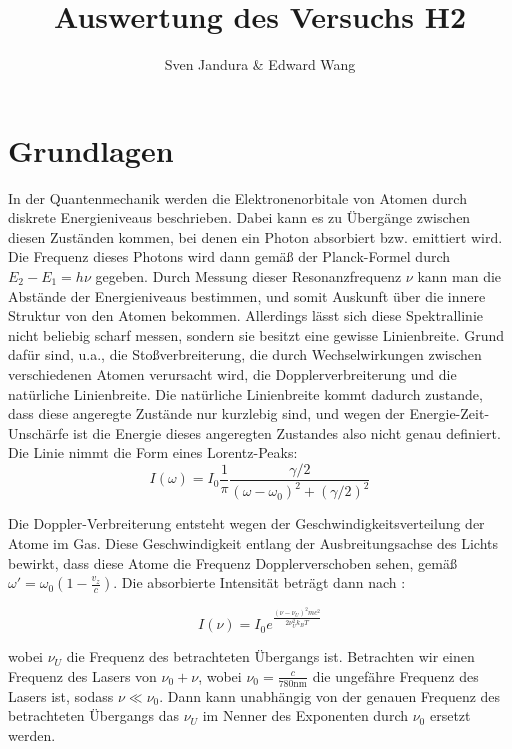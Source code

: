 \documentclass[a4paper,parskip]{scrartcl}
\author{Sven Jandura \& Edward Wang}
\title{Auswertung des Versuchs H2}
\begin{document}
\maketitle

\tableofcontents

\section{Grundlagen}

In der Quantenmechanik werden die Elektronenorbitale von Atomen durch diskrete Energieniveaus beschrieben. Dabei kann es zu Übergänge zwischen diesen Zuständen kommen, bei denen ein Photon absorbiert bzw. emittiert wird. Die Frequenz dieses Photons wird dann gemäß der Planck-Formel durch $E_2 - E_1 = h \nu$ gegeben. Durch Messung dieser Resonanzfrequenz $\nu$ kann man die Abstände der Energieniveaus bestimmen, und somit Auskunft über die innere Struktur von den Atomen bekommen. Allerdings lässt sich diese Spektrallinie nicht beliebig scharf messen, sondern sie besitzt eine gewisse Linienbreite. Grund dafür sind, u.a., die Stoßverbreiterung, die durch Wechselwirkungen zwischen verschiedenen Atomen verursacht wird, die Dopplerverbreiterung und die natürliche Linienbreite. Die natürliche Linienbreite kommt dadurch zustande, dass diese angeregte Zustände nur kurzlebig sind, und wegen der Energie-Zeit-Unschärfe ist die Energie dieses angeregten Zustandes also nicht genau definiert. Die Linie nimmt die Form eines Lorentz-Peaks:
\begin{equation*}
    I(\omega) = I_0 \frac{1}{\pi} \frac{\gamma/2}{(\omega - \omega_0)^2 + (\gamma / 2)^2}
\end{equation*}

Die Doppler-Verbreiterung entsteht wegen der Geschwindigkeitsverteilung der Atome im Gas. Diese Geschwindigkeit entlang der Ausbreitungsachse des Lichts bewirkt, dass diese Atome die Frequenz Dopplerverschoben sehen, gemäß $\omega' = \omega_0 \left( 1 - \frac{v_z}{c} \right) $.
Die absorbierte Intensität beträgt dann nach \cite{Ref:3}:

$$I(\nu) = I_0 e^{\frac{(\nu-\nu_U)^2mc^2}{2\nu_U^2 k_B T}}$$

wobei $\nu_U$ die Frequenz des betrachteten Übergangs ist. Betrachten wir einen Frequenz des Lasers von $\nu_0+\nu$, wobei $\nu_0 = \frac{c}{780 \mathrm{ nm}}$ die ungefähre Frequenz des Lasers ist, sodass $\nu \ll \nu_0$. Dann kann unabhängig von der genauen Frequenz des betrachteten Übergangs das $\nu_U$ im Nenner des Exponenten durch $\nu_0$ ersetzt werden. \\
\end{document}
